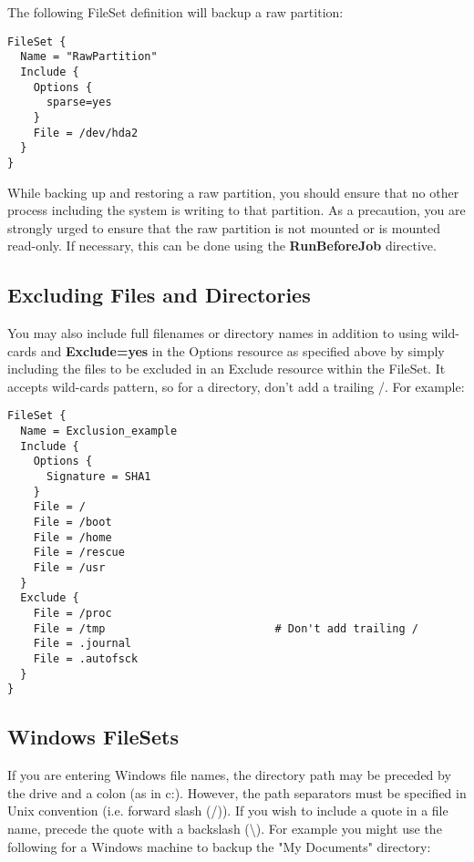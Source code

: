 The following FileSet definition will backup a raw partition:

\footnotesize
\begin{verbatim}
FileSet {
  Name = "RawPartition"
  Include {
    Options {
      sparse=yes
    }
    File = /dev/hda2
  }
}
\end{verbatim}
\normalsize

While backing up and restoring a raw partition, you should ensure that no
other process including the system is writing to that partition. As a
precaution, you are strongly urged to ensure that the raw partition is not
mounted or is mounted read-only. If necessary, this can be done using the {\bf
RunBeforeJob} directive.


\subsection{Excluding Files and Directories}

You may also include full filenames or directory names in addition to using
wild-cards and {\bf Exclude=yes} in the Options resource as specified above by
simply including the files to be excluded in an Exclude resource within the
FileSet. It accepts wild-cards pattern, so for a directory, don't add a trailing
/. For example:

\footnotesize
\begin{verbatim}
FileSet {
  Name = Exclusion_example
  Include {
    Options {
      Signature = SHA1
    }
    File = /
    File = /boot
    File = /home
    File = /rescue
    File = /usr
  }
  Exclude {
    File = /proc
    File = /tmp                          # Don't add trailing /
    File = .journal
    File = .autofsck
  }
}
\end{verbatim}
\normalsize

\subsection{Windows FileSets}
\label{win32}
If you are entering Windows file names, the directory path may be preceded by
the drive and a colon (as in c:). However, the path separators must be
specified in Unix convention (i.e. forward slash (/)). If you wish to include
a quote in a file name, precede the quote with a backslash
(\textbackslash{}). For example you might use the following
for a Windows machine to backup the "My Documents" directory:


